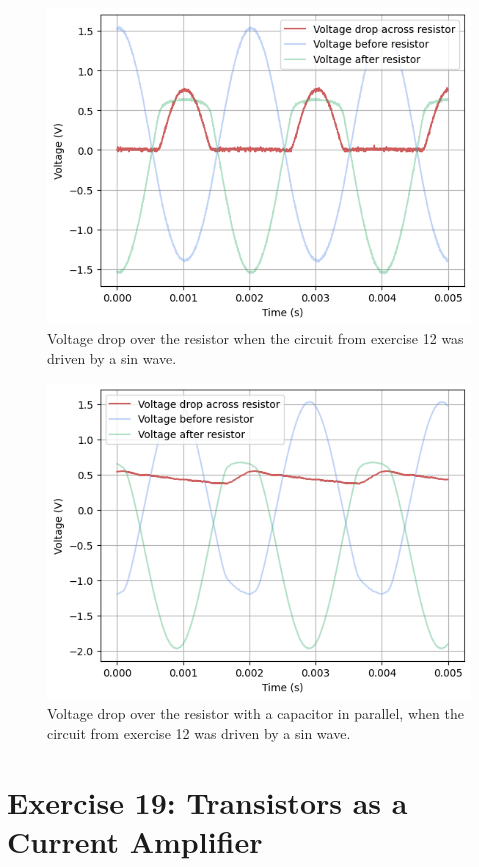 \documentclass[%
reprint,
amsmath,amssymb,
aps,
floatfix
]{revtex4-2}
\begin{document}
		\begin{figure}
			\includegraphics[width=0.85\columnwidth]{ex12bResults.png}
			\caption{\label{fig:ex12bResults}Voltage drop over the resistor when the circuit from exercise 12 was driven by a sin wave.}
		\end{figure}
	
		\begin{figure}
			\includegraphics[width=0.85\columnwidth]{ex12bResultsWithCap.png}
			\caption{\label{fig:ex12bResultsWithCap}Voltage drop over the resistor with a capacitor in parallel, when the circuit from exercise 12 was driven by a sin wave.}
		\end{figure}
		
	\section{Exercise 19: Transistors as a Current Amplifier}
\end{document}
